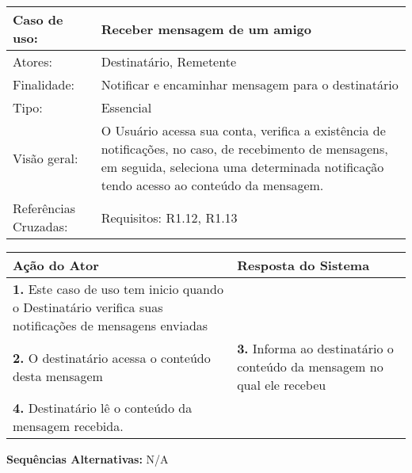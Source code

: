 \documentclass[12pt,a4paper,onecolumn,titlepage]{article}
\begin{document}
\begin{table}[h!]
\begin{center}
\begin{tabular}{p{2.5cm} p{9.5cm}}
Caso de uso: & \textbf{Receber mensagem de um amigo} \\ \hline
Atores: & Destinatário, Remetente \\ \hline
Finalidade: & Notificar e encaminhar mensagem para o destinatário\\ \hline
Tipo: & Essencial \\ \hline
Visão geral: & O Usuário acessa sua conta, verifica a existência de notificações, no caso, de recebimento de mensagens, em seguida, seleciona uma determinada notificação tendo acesso ao conteúdo da mensagem. \\ \hline
Referências Cruzadas: & Requisitos: R1.12, R1.13\\

\end{tabular}
\end{center}
\end{table} 

\begin{center}
\def\arraystretch{1.1}
\begin{tabular}{|p{6cm}|p{6cm}|}

\hline
\textbf{Ação do Ator} & \textbf{Resposta do Sistema} \\ \hline
\textbf{1.} Este caso de uso tem inicio quando o Destinatário verifica suas notificações de mensagens enviadas  &  \\ \hline
\textbf{2.} O destinatário acessa o conteúdo desta mensagem  & 
\textbf{3.} Informa ao destinatário o conteúdo da mensagem no qual ele recebeu \\ \hline
\textbf{4.} Destinatário lê o conteúdo da mensagem recebida. & \\ \hline
\end{tabular}
\end{center}

\textbf{Sequências Alternativas:} N/A

\newpage
\end{document}
